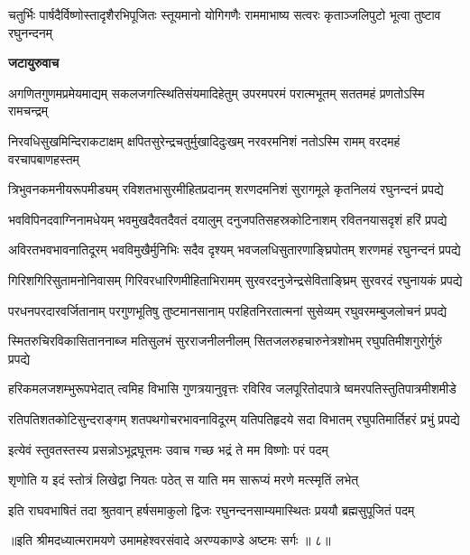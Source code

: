 \threelineshloka
{चतुर्भिः पार्षदैर्विष्णोस्तादृशैरभिपूजितः}
{स्तूयमानो योगिगणैः राममाभाष्य सत्वरः}
{कृताञ्जलिपुटो भूत्वा तुष्टाव रघुनन्दनम्} %

\textbf{जटायुरुवाच}

\fourlineindentedshloka
{अगणितगुणमप्रमेयमाद्यम्}
{सकलजगत्स्थितिसंयमादिहेतुम्}
{उपरमपरमं परात्मभूतम्}
{सततमहं प्रणतोऽस्मि रामचन्द्रम्} %

\fourlineindentedshloka
{निरवधिसुखमिन्दिराकटाक्षम्}
{क्षपितसुरेन्द्रचतुर्मुखादिदुःखम्}
{नरवरमनिशं नतोऽस्मि रामम्}
{वरदमहं वरचापबाणहस्तम्} %

\fourlineindentedshloka
{त्रिभुवनकमनीयरूपमीड्यम्}
{रविशतभासुरमीहितप्रदानम्}
{शरणदमनिशं सुरागमूले}
{कृतनिलयं रघुनन्दनं प्रपद्ये} %

\fourlineindentedshloka
{भवविपिनदवाग्निनामधेयम्}
{भवमुखदैवतदैवतं दयालुम्}
{दनुजपतिसहस्रकोटिनाशम्}
{रवितनयासदृशं हरिं प्रपद्ये} %

\fourlineindentedshloka
{अविरतभवभावनातिदूरम्}
{भवविमुखैर्मुनिभिः सदैव दृश्यम्}
{भवजलधिसुतारणाङ्घ्रिपोतम्}
{शरणमहं रघुनन्दनं प्रपद्ये} %

\fourlineindentedshloka
{गिरिशगिरिसुतामनोनिवासम्}
{गिरिवरधारिणमीहिताभिरामम्}
{सुरवरदनुजेन्द्रसेविताङ्घ्रिम्}
{सुरवरदं रघुनायकं प्रपद्ये} %

\fourlineindentedshloka
{परधनपरदारवर्जितानाम्}
{परगुणभूतिषु तुष्टमानसानाम्}
{परहितनिरतात्मनां सुसेव्यम्}
{रघुवरमम्बुजलोचनं प्रपद्ये} %

\fourlineindentedshloka
{स्मितरुचिरविकासिताननाब्ज\-}
{मतिसुलभं सुरराजनीलनीलम्}
{सितजलरुहचारुनेत्रशोभम्}
{रघुपतिमीशगुरोर्गुरुं प्रपद्ये} %

\fourlineindentedshloka
{हरिकमलजशम्भुरूपभेदात्\-}
{त्वमिह विभासि गुणत्रयानुवृत्तः}
{रविरिव जलपूरितोदपात्रे\-}
{ष्वमरपतिस्तुतिपात्रमीशमीडे} %

\fourlineindentedshloka
{रतिपतिशतकोटिसुन्दराङ्गम्}
{शतपथगोचरभावनाविदूरम्}
{यतिपतिहृदये सदा विभातम्}
{रघुपतिमार्तिहरं प्रभुं प्रपद्ये} %

\twolineshloka
{इत्येवं स्तुवतस्तस्य प्रसन्नोऽभूद्रघूत्तमः}
{उवाच गच्छ भद्रं ते मम विष्णोः परं पदम्} %

\twolineshloka
{शृणोति य इदं स्तोत्रं लिखेद्वा नियतः पठेत्}
{स याति मम सारूप्यं मरणे मत्स्मृतिं लभेत्} %

\fourlineindentedshloka
{इति राघवभाषितं तदा}
{श्रुतवान् हर्षसमाकुलो द्विजः}
{रघुनन्दनसाम्यमास्थितः}
{प्रययौ ब्रह्मसुपूजितं पदम्} %

{॥इति श्रीमदध्यात्मरामयणे उमामहेश्वरसंवादे
अरण्यकाण्डे अष्टमः सर्गः ॥ ८॥
}



